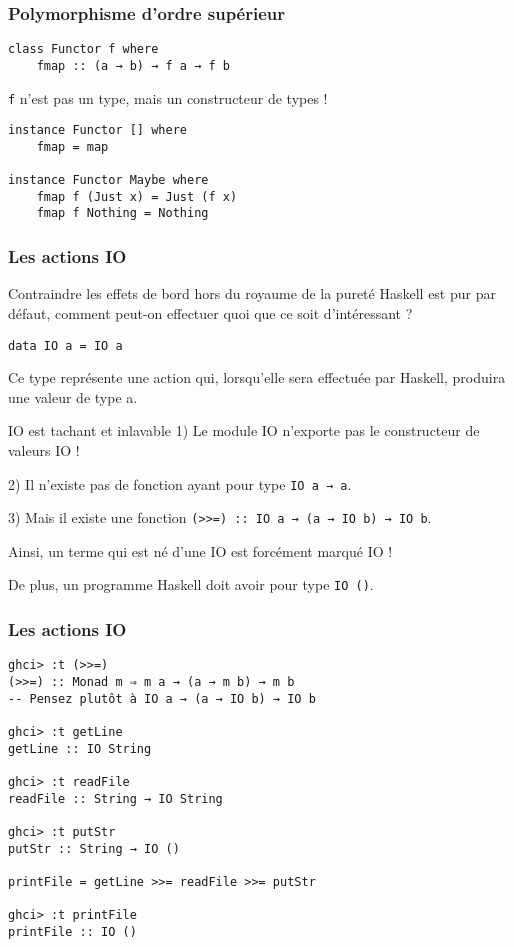 \documentclass[10pt]{beamer}
\begin{document}
\begin{frame}[fragile]
\frametitle{Polymorphisme d'ordre supérieur}
\begin{verbatim}
class Functor f where
    fmap :: (a → b) → f a → f b
\end{verbatim}

\verb|f| n'est pas un type, mais un constructeur de types !

\begin{verbatim}
instance Functor [] where
    fmap = map

instance Functor Maybe where
    fmap f (Just x) = Just (f x)
    fmap f Nothing = Nothing
\end{verbatim}
\end{frame}



\begin{frame}[fragile]
\frametitle{Les actions IO}
\begin{block}
{Contraindre les effets de bord hors du royaume de la pureté}
Haskell est pur par défaut, comment peut-on effectuer quoi que ce soit
d'intéressant ?

\verb|data IO a = IO a|

Ce type représente une action qui, lorsqu'elle sera effectuée par Haskell,
produira une valeur de type a.
\end{block}

\begin{block}
{IO est tachant et inlavable}
1) Le module IO n'exporte pas le constructeur de valeurs IO !

2) Il n'existe pas de fonction ayant pour type \verb|IO a → a|.

3) Mais il existe une fonction \verb|(>>=) :: IO a → (a → IO b) → IO b|.

Ainsi, un terme qui est né d'une IO est forcément marqué IO !
\end{block}

De plus, un programme Haskell doit avoir pour type \verb|IO ()|.
\end{frame}



\begin{frame}[fragile]
\frametitle{Les actions IO}
\begin{verbatim}
ghci> :t (>>=)
(>>=) :: Monad m ⇒ m a → (a → m b) → m b
-- Pensez plutôt à IO a → (a → IO b) → IO b

ghci> :t getLine
getLine :: IO String

ghci> :t readFile
readFile :: String → IO String

ghci> :t putStr
putStr :: String → IO ()

printFile = getLine >>= readFile >>= putStr

ghci> :t printFile
printFile :: IO ()
\end{verbatim}
\end{frame}
\end{document}
